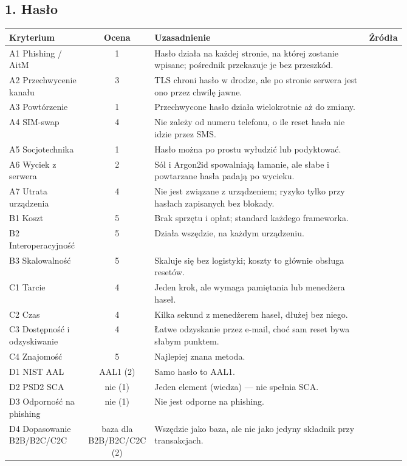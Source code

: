 \subsection*{1. Hasło}
\begingroup\small
\begin{longtable}{@{}p{0.2\linewidth}c p{0.56\linewidth}l@{}}
\toprule
Kryterium & Ocena & Uzasadnienie & Źródła \\
\midrule
\endhead
A1 Phishing / AitM & 1 & Hasło działa na każdej stronie, na której zostanie wpisane; pośrednik przekazuje je bez przeszkód. & \cite{A1,P6} \\
A2 Przechwycenie kanału & 3 & TLS chroni hasło w drodze, ale po stronie serwera jest ono przez chwilę jawne. & \cite{N1,N4} \\
A3 Powtórzenie & 1 & Przechwycone hasło działa wielokrotnie aż do zmiany. & \cite{P6,X1} \\
A4 SIM-swap & 4 & Nie zależy od numeru telefonu, o ile reset hasła nie idzie przez SMS. & \cite{N1,P11} \\
A5 Socjotechnika & 1 & Hasło można po prostu wyłudzić lub podyktować. & \cite{N5,P6} \\
A6 Wyciek z serwera & 2 & Sól i Argon2id spowalniają łamanie, ale słabe i powtarzane hasła padają po wycieku. & \cite{X3,X4} \\
A7 Utrata urządzenia & 4 & Nie jest związane z urządzeniem; ryzyko tylko przy hasłach zapisanych bez blokady. & \cite{N1} \\
B1 Koszt & 5 & Brak sprzętu i opłat; standard każdego frameworka. & \cite{X1,P7} \\
B2 Interoperacyjność & 5 & Działa wszędzie, na każdym urządzeniu. & \cite{X1} \\
B3 Skalowalność & 5 & Skaluje się bez logistyki; koszty to głównie obsługa resetów. & \cite{X1} \\
C1 Tarcie & 4 & Jeden krok, ale wymaga pamiętania lub menedżera haseł. & \cite{P8,X1} \\
C2 Czas & 4 & Kilka sekund z menedżerem haseł, dłużej bez niego. & \cite{P1} \\
C3 Dostępność i odzyskiwanie & 4 & Łatwe odzyskanie przez e-mail, choć sam reset bywa słabym punktem. & \cite{P11} \\
C4 Znajomość & 5 & Najlepiej znana metoda. & \cite{P8,X1} \\
D1 NIST AAL & AAL1 (2) & Samo hasło to AAL1. & \cite{N1} \\
D2 PSD2 SCA & nie (1) & Jeden element (wiedza) — nie spełnia SCA. & \cite{N3} \\
D3 Odporność na phishing & nie (1) & Nie jest odporne na phishing. & \cite{N1,P6} \\
D4 Dopasowanie B2B/B2C/C2C & baza dla B2B/B2C/C2C (2) & Wszędzie jako baza, ale nie jako jedyny składnik przy transakcjach. & \cite{N3,N4} \\
\bottomrule
\end{longtable}
\endgroup

